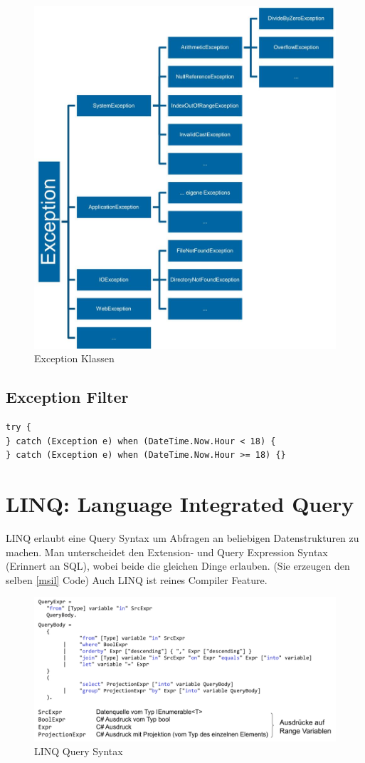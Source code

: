 \documentclass[
a4paper,
oneside,
10pt,
fleqn,
headsepline,
toc=listofnumbered, 
bibliography=totocnumbered]{scrartcl}
\let\stdsection\section
\renewcommand\section{\clearpage\stdsection}
\begin{document}
\begin{figure}[h]
	\centering
	\includegraphics[width=0.5\linewidth]{images/exception_classes}
	\caption{Exception Klassen}
	\label{fig:exceptionclasses}
\end{figure}

\subsection{Exception Filter}
\begin{lstlisting}
try {
} catch (Exception e) when (DateTime.Now.Hour < 18) {
} catch (Exception e) when (DateTime.Now.Hour >= 18) {}
\end{lstlisting}



\section{LINQ: Language Integrated Query}


LINQ erlaubt eine Query Syntax um Abfragen an beliebigen Datenstrukturen zu machen. Man unterscheidet den Extension- und Query Expression Syntax (Erinnert an SQL), wobei beide die gleichen Dinge erlauben. (Sie erzeugen den selben \ref{msil} Code) Auch LINQ ist reines Compiler Feature.

\begin{figure}[h]
\centering
\includegraphics[width=0.7\linewidth]{images/query_syntax}
\caption{LINQ Query Syntax}
\label{fig:linqcomponents}
\end{figure}
\end{document}
